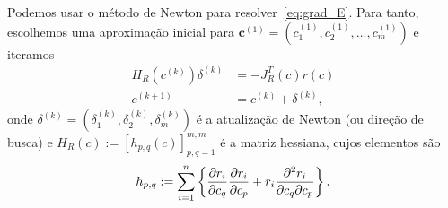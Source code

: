 Podemos usar o método de Newton para resolver~\eqref{eq:grad_E}. Para tanto, escolhemos uma aproximação inicial para $\pmb{c}^{(1)} = (c_1^{(1)}, c_2^{(1)}, \dotsc, c_m^{(1)})$ e iteramos
\begin{align}
  H_R(c^{(k)})\delta^{(k)} &= -J_R^T(c)r(c) \label{eq:mqnl_newton1}\\
  c^{(k+1)} &= c^{(k)} + \delta^{(k)} \label{eq:mqnl_newton2},
\end{align}
onde $\delta^{(k)} = (\delta_1^{(k)}, \delta_2^{(k)}, \delta_m^{(k)})$ é a atualização de Newton (ou direção de busca) e $H_R(c) := [h_{p,q}(c)]_{p,q=1}^{m,m}$ é a matriz hessiana, cujos elementos são
\begin{equation}
  h_{p,q} := \sum_{i=1}^n\left\{\frac{\partial r_i}{\partial c_q}\frac{\partial r_i}{\partial c_p} + r_i\frac{\partial^2 r_i}{\partial c_q\partial c_p}\right\}.
\end{equation}

